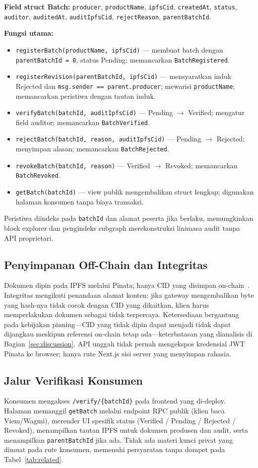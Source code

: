\textbf{Field struct Batch:}
\texttt{producer}, \texttt{productName}, \texttt{ipfsCid}, \texttt{createdAt}, \texttt{status}, \texttt{auditor}, \texttt{auditedAt}, \texttt{auditIpfsCid}, \texttt{rejectReason}, \texttt{parentBatchId}.

\textbf{Fungsi utama:}
\begin{itemize}
  \item \texttt{registerBatch(productName, ipfsCid)} --- membuat batch dengan \texttt{parentBatchId = 0}, status Pending; memancarkan \texttt{BatchRegistered}.
  \item \texttt{registerRevision(parentBatchId, ipfsCid)} --- mensyaratkan induk Rejected dan \texttt{msg.sender == parent.producer}; mewarisi \texttt{productName}; memancarkan peristiwa dengan tautan induk.
  \item \texttt{verifyBatch(batchId, auditIpfsCid)} --- Pending $\rightarrow$ Verified; mengatur field auditor; memancarkan \texttt{BatchVerified}.
  \item \texttt{rejectBatch(batchId, reason, auditIpfsCid)} --- Pending $\rightarrow$ Rejected; menyimpan alasan; memancarkan \texttt{BatchRejected}.
  \item \texttt{revokeBatch(batchId, reason)} --- Verified $\rightarrow$ Revoked; memancarkan \texttt{BatchRevoked}.
  \item \texttt{getBatch(batchId)} --- view publik mengembalikan struct lengkap; digunakan halaman konsumen tanpa biaya transaksi.
\end{itemize}

Peristiwa diindeks pada \texttt{batchId} dan alamat peserta jika berlaku, memungkinkan block explorer dan pengindeks subgraph merekonstruksi linimasa audit tanpa API proprietari.

\subsection{Penyimpanan Off-Chain dan Integritas}
Dokumen dipin pada IPFS melalui Pinata; hanya CID yang disimpan on-chain~\cite{benet2014ipfs,christidis2016blockchain}.
Integritas mengikuti penandaan alamat konten: jika gateway mengembalikan byte yang hash-nya tidak cocok dengan CID yang dikaitkan, klien harus memperlakukan dokumen sebagai tidak terpercaya.
Ketersediaan bergantung pada kebijakan pinning---CID yang tidak dipin dapat menjadi tidak dapat dijangkau meskipun referensi on-chain tetap ada---keterbatasan yang dianalisis di Bagian~\ref{sec:discussion}.
API unggah tidak pernah mengekspos kredensial JWT Pinata ke browser; hanya rute Next.js sisi server yang menyimpan rahasia.

\subsection{Jalur Verifikasi Konsumen}
Konsumen mengakses \texttt{/verify/\{batchId\}} pada frontend yang di-deploy.
Halaman memanggil \texttt{getBatch} melalui endpoint RPC publik (klien baca Viem/Wagmi), merender UI spesifik status (Verified / Pending / Rejected / Revoked), menampilkan tautan IPFS untuk dokumen produsen dan audit, serta menampilkan \texttt{parentBatchId} jika ada.
Tidak ada materi kunci privat yang dimuat pada rute konsumen, memenuhi persyaratan tanpa dompet pada Tabel~\ref{tab:related}.
